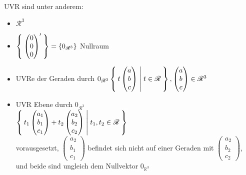 \documentclass{../tudscript}
\begin{document}
\hypertarget{beispiel-vr-mathscrr3}{%
\label{beispiel-vr-mathscrr3}}

UVR sind unter anderem:

\begin{itemize}
\tightlist
\item
  \(\mathscr{R}^3\)
\item
  \(\Set{\begin{pmatrix}0\\0\\0\end{pmatrix}^\prime} = \{0_{\mathscr{R}^3}\}\)
  Nullraum
\item
  UVRe der Geraden durch\hfill\quad\linebreak 
  \(0_{\mathscr{R}^3}\Set{t\begin{pmatrix}a\\b\\c\end{pmatrix} | t \in \mathscr{R}}, \begin{pmatrix}a\\b\\c\end{pmatrix} \in \mathscr{R}^3\)
\item
  UVR Ebene durch \(0_{\mathscr{R}^3}\)\\
  \(\Set{t_1 \begin{pmatrix}a_1\\b_1\\c_1\end{pmatrix} + t_2 \begin{pmatrix}a_2\\b_2\\c_2\end{pmatrix} | t_1,t_2 \in \mathscr{R}}\)\\
  vorausgesetzt, \(\begin{pmatrix}a_2\\b_1\\c_1\end{pmatrix}\) befindet
  sich nicht auf einer Geraden mit
  \(\begin{pmatrix}a_2\\b_2\\c_2\end{pmatrix}\), und beide sind ungleich
  dem Nullvektor \(0_{\mathbb{R}^3}\)
\end{itemize}

\hypertarget{allgemein}{%
\label{allgemein}}
\end{document}
